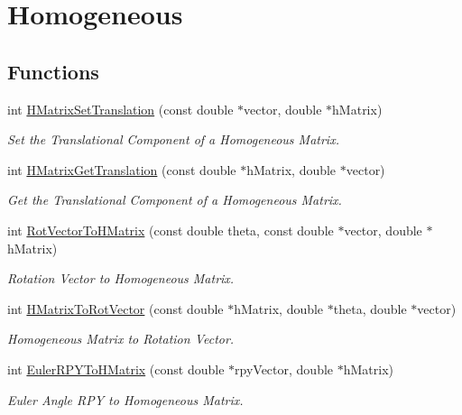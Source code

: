 \hypertarget{group__homogeneous}{
\section{Homogeneous}
\label{group__homogeneous}
}
\subsection*{Functions}
\begin{CompactItemize}
\item 
int \hyperlink{group__homogeneous_gac5515e14e14afacf5cf678705c499f0}{HMatrixSetTranslation} (const double $\ast$vector, double $\ast$hMatrix)
\begin{CompactList}\small\item\em Set the Translational Component of a Homogeneous Matrix. \item\end{CompactList}\item 
int \hyperlink{group__homogeneous_gea46cfbea64dcd828a7ad9c0a1a58804}{HMatrixGetTranslation} (const double $\ast$hMatrix, double $\ast$vector)
\begin{CompactList}\small\item\em Get the Translational Component of a Homogeneous Matrix. \item\end{CompactList}\item 
int \hyperlink{group__homogeneous_ge57333c09ab072ba908b1bd7f75eb586}{RotVectorToHMatrix} (const double theta, const double $\ast$vector, double $\ast$hMatrix)
\begin{CompactList}\small\item\em Rotation Vector to Homogeneous Matrix. \item\end{CompactList}\item 
int \hyperlink{group__homogeneous_g764502d28de75923b75fbc4bcf109e68}{HMatrixToRotVector} (const double $\ast$hMatrix, double $\ast$theta, double $\ast$vector)
\begin{CompactList}\small\item\em Homogeneous Matrix to Rotation Vector. \item\end{CompactList}\item 
int \hyperlink{group__homogeneous_g0be4d04db6aa88d63dd839ba12b4ecb7}{EulerRPYToHMatrix} (const double $\ast$rpyVector, double $\ast$hMatrix)
\begin{CompactList}\small\item\em Euler Angle RPY to Homogeneous Matrix. \item\end{CompactList}\item 

\end{CompactItemize}
